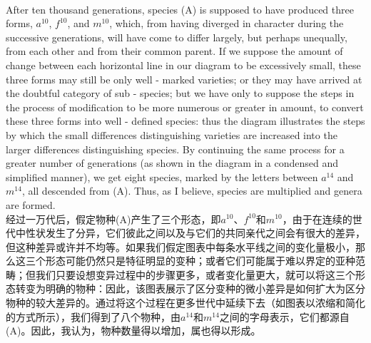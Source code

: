 \documentclass{article}
\begin{document}
\\
After ten thousand generations, species (A) is supposed to have produced three forms, $a^{10}$, $f^{10}$, and $m^{10}$, which, from having diverged in character during the successive generations, will have come to differ largely, but perhaps unequally, from each other and from their common parent. If we suppose the amount of change between each horizontal line in our diagram to be excessively small, these three forms may still be only well - marked varieties; or they may have arrived at the doubtful category of sub - species; but we have only to suppose the steps in the process of modification to be more numerous or greater in amount, to convert these three forms into well - defined species: thus the diagram illustrates the steps by which the small differences distinguishing varieties are increased into the larger differences distinguishing species. By continuing the same process for a greater number of generations (as shown in the diagram in a condensed and simplified manner), we get eight species, marked by the letters between $a^{14}$ and $m^{14}$, all descended from (A). Thus, as I believe, species are multiplied and genera are formed.\\
经过一万代后，假定物种(A)产生了三个形态，即$a^{10}$、$f^{10}$和$m^{10}$，由于在连续的世代中性状发生了分异，它们彼此之间以及与它们的共同亲代之间会有很大的差异，但这种差异或许并不均等。如果我们假定图表中每条水平线之间的变化量极小，那么这三个形态可能仍然只是特征明显的变种；或者它们可能属于难以界定的亚种范畴；但我们只要设想变异过程中的步骤更多，或者变化量更大，就可以将这三个形态转变为明确的物种：因此，该图表展示了区分变种的微小差异是如何扩大为区分物种的较大差异的。通过将这个过程在更多世代中延续下去（如图表以浓缩和简化的方式所示），我们得到了八个物种，由$a^{14}$和$m^{14}$之间的字母表示，它们都源自(A)。因此，我认为，物种数量得以增加，属也得以形成。 \\
\end{document}
